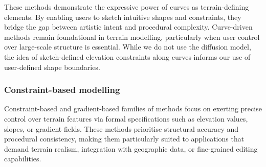 
\smallConclusion

These methods demonstrate the expressive power of curves as terrain-defining elements. By enabling users to sketch intuitive shapes and constraints, they bridge the gap between artistic intent and procedural complexity. Curve-driven methods remain foundational in terrain modelling, particularly when user control over large-scale structure is essential. While we do not use the diffusion model, the idea of sketch-defined elevation constraints along curves informs our use of user-defined shape boundaries.

\subsubsection{Constraint-based modelling}

Constraint-based and gradient-based families of methods focus on exerting precise control over terrain features via formal specifications such as elevation values, slopes, or gradient fields. These methods prioritise structural accuracy and procedural consistency, making them particularly suited to applications that demand terrain realism, integration with geographic data, or fine-grained editing capabilities.

